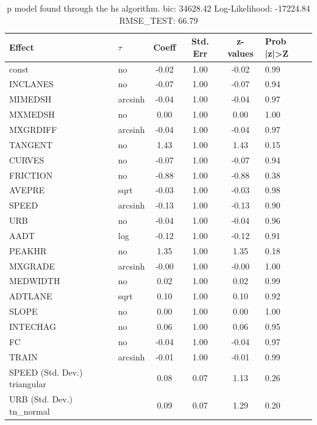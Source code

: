 \begin{table}
	\caption{p model found through the hs algorithm. bic: 34628.42 Log-Likelihood: -17224.84 RMSE_TEST: 66.79}
	\begin{center}
		\begin{tabular}{|l|l|c|c|c|l|}
			\hline
			Effect & $\tau$ & Coeff & Std. Err & z-values & Prob |z|>Z \\
			\hline
			const & no & -0.02 & 1.00 & -0.02 & 0.99 \\
			\hline
			INCLANES & no & -0.07 & 1.00 & -0.07 & 0.94 \\
			\hline
			MIMEDSH & arcsinh & -0.04 & 1.00 & -0.04 & 0.97 \\
			\hline
			MXMEDSH & no & 0.00 & 1.00 & 0.00 & 1.00 \\
			\hline
			MXGRDIFF & arcsinh & -0.04 & 1.00 & -0.04 & 0.97 \\
			\hline
			TANGENT & no & 1.43 & 1.00 & 1.43 & 0.15 \\
			\hline
			CURVES & no & -0.07 & 1.00 & -0.07 & 0.94 \\
			\hline
			FRICTION & no & -0.88 & 1.00 & -0.88 & 0.38 \\
			\hline
			AVEPRE & sqrt & -0.03 & 1.00 & -0.03 & 0.98 \\
			\hline
			SPEED & arcsinh & -0.13 & 1.00 & -0.13 & 0.90 \\
			\hline
			URB & no & -0.04 & 1.00 & -0.04 & 0.96 \\
			\hline
			AADT & log & -0.12 & 1.00 & -0.12 & 0.91 \\
			\hline
			PEAKHR & no & 1.35 & 1.00 & 1.35 & 0.18 \\
			\hline
			MXGRADE & arcsinh & -0.00 & 1.00 & -0.00 & 1.00 \\
			\hline
			MEDWIDTH & no & 0.02 & 1.00 & 0.02 & 0.99 \\
			\hline
			ADTLANE & sqrt & 0.10 & 1.00 & 0.10 & 0.92 \\
			\hline
			SLOPE & no & 0.00 & 1.00 & 0.00 & 1.00 \\
			\hline
			INTECHAG & no & 0.06 & 1.00 & 0.06 & 0.95 \\
			\hline
			FC & no & -0.04 & 1.00 & -0.04 & 0.97 \\
			\hline
			TRAIN & arcsinh & -0.01 & 1.00 & -0.01 & 0.99 \\
			\hline
			SPEED (Std. Dev.) triangular &  & 0.08 & 0.07 & 1.13 & 0.26 \\
			\hline
			URB (Std. Dev.) tn_normal &  & 0.09 & 0.07 & 1.29 & 0.20 \\

\end{tabular}
\end{center}
\end{table}
